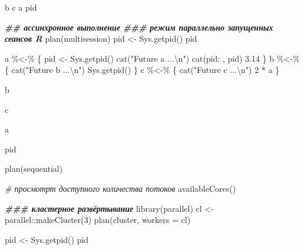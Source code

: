 \documentclass[
]{book}
\newenvironment{Shaded}{\begin{snugshade}}{\end{snugshade}}
\newcommand{\AttributeTok}[1]{\textcolor[rgb]{0.77,0.63,0.00}{#1}}
\newcommand{\CommentTok}[1]{\textcolor[rgb]{0.56,0.35,0.01}{\textit{#1}}}
\newcommand{\DecValTok}[1]{\textcolor[rgb]{0.00,0.00,0.81}{#1}}
\newcommand{\DocumentationTok}[1]{\textcolor[rgb]{0.56,0.35,0.01}{\textbf{\textit{#1}}}}
\newcommand{\FloatTok}[1]{\textcolor[rgb]{0.00,0.00,0.81}{#1}}
\newcommand{\FunctionTok}[1]{\textcolor[rgb]{0.00,0.00,0.00}{#1}}
\newcommand{\NormalTok}[1]{#1}
\newcommand{\OtherTok}[1]{\textcolor[rgb]{0.56,0.35,0.01}{#1}}
\newcommand{\SpecialCharTok}[1]{\textcolor[rgb]{0.00,0.00,0.00}{#1}}
\newcommand{\StringTok}[1]{\textcolor[rgb]{0.31,0.60,0.02}{#1}}
\begin{document}
\begin{Shaded}
\begin{Highlighting}[]
\NormalTok{b}
\NormalTok{c}
\NormalTok{a}
\NormalTok{pid}

\DocumentationTok{\#\# ассинхронное выполнение}
\DocumentationTok{\#\#\# режим параллельно запущенных сеансов R}
\FunctionTok{plan}\NormalTok{(multisession)}
\NormalTok{pid }\OtherTok{\textless{}{-}} \FunctionTok{Sys.getpid}\NormalTok{()}
\NormalTok{pid}

\NormalTok{a }\SpecialCharTok{\%\textless{}{-}\%}\NormalTok{ \{}
\NormalTok{  pid }\OtherTok{\textless{}{-}} \FunctionTok{Sys.getpid}\NormalTok{()}
  \FunctionTok{cat}\NormalTok{(}\StringTok{"Future \textquotesingle{}a\textquotesingle{} ...}\SpecialCharTok{\textbackslash{}n}\StringTok{"}\NormalTok{)}
  \FunctionTok{cat}\NormalTok{(}\StringTok{\textquotesingle{}pid: \textquotesingle{}}\NormalTok{, pid)}
  \FloatTok{3.14}
\NormalTok{  \}}
\NormalTok{b }\SpecialCharTok{\%\textless{}{-}\%}\NormalTok{ \{}
  \FunctionTok{cat}\NormalTok{(}\StringTok{"Future \textquotesingle{}b\textquotesingle{} ...}\SpecialCharTok{\textbackslash{}n}\StringTok{"}\NormalTok{)}
  \FunctionTok{Sys.getpid}\NormalTok{()}
\NormalTok{  \}}
\NormalTok{c }\SpecialCharTok{\%\textless{}{-}\%}\NormalTok{ \{}
  \FunctionTok{cat}\NormalTok{(}\StringTok{"Future \textquotesingle{}c\textquotesingle{} ...}\SpecialCharTok{\textbackslash{}n}\StringTok{"}\NormalTok{)}
  \DecValTok{2} \SpecialCharTok{*}\NormalTok{ a}
\NormalTok{\}}

\NormalTok{b}

\NormalTok{c}

\NormalTok{a}

\NormalTok{pid}

\FunctionTok{plan}\NormalTok{(sequential)}

\CommentTok{\# просмотрт доступного количества потоков}
\FunctionTok{availableCores}\NormalTok{()}

\DocumentationTok{\#\#\# кластерное развёртывание}
\FunctionTok{library}\NormalTok{(parallel)}
\NormalTok{cl }\OtherTok{\textless{}{-}}\NormalTok{ parallel}\SpecialCharTok{::}\FunctionTok{makeCluster}\NormalTok{(}\DecValTok{3}\NormalTok{)}
\FunctionTok{plan}\NormalTok{(cluster, }\AttributeTok{workers =}\NormalTok{ cl)}

\NormalTok{pid }\OtherTok{\textless{}{-}} \FunctionTok{Sys.getpid}\NormalTok{()}
\NormalTok{pid}


\end{Highlighting}
\end{Shaded}
\end{document}
